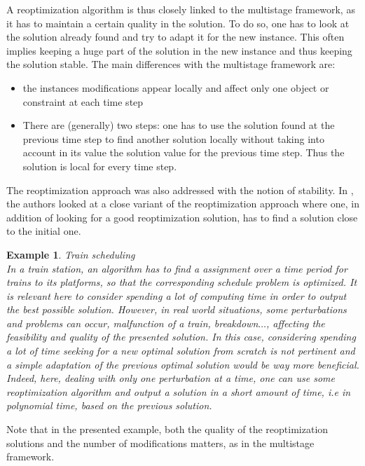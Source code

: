 \documentclass[a4paper]{book}
\newtheorem{ex}{Example}[chapter]
\begin{document}
A reoptimization algorithm is thus closely linked to the multistage framework, as it has to maintain a certain quality in the solution. To do so, one has to look at the solution already found and try to adapt it for the new instance. This often implies keeping a huge part of the solution in the new instance and thus keeping the solution stable. The main differences with the multistage framework are:
\begin{itemize}
    \item the instances modifications appear locally and affect only one object or constraint at each time step
    \item There are (generally) two steps: one has to use the solution found at the previous time step to find another solution locally without taking into account in its value the solution value for the previous time step. Thus the solution is local for every time step.
\end{itemize} 

The reoptimization approach was also addressed with the notion of stability. In \cite{CohenCDL16}, the authors looked at a close variant of the reoptimization approach where one, in addition of looking for a good reoptimization solution, has to find a solution close to the initial one. 

\begin{ex}
Train scheduling \\
In a train station, an algorithm has to find a assignment over a time period for trains to its platforms, so that the corresponding schedule problem is optimized. It is relevant here to consider spending a lot of computing time in order to output the best possible solution. However, in real world situations, some perturbations and problems can occur, malfunction of a train, breakdown$\ldots$, affecting the feasibility and quality of the presented solution. In this case, considering spending a lot of time seeking for a new optimal solution from scratch is not pertinent and a simple adaptation of the previous optimal solution would be way more beneficial. Indeed, here, dealing with only one perturbation at a time, one can use some reoptimization algorithm and output a solution in a short amount of time, i.e in polynomial time, based on the previous solution.

\end{ex}
Note that in the presented example, both the quality of the reoptimization solutions and the number of modifications matters, as in the multistage framework.
\end{document}
